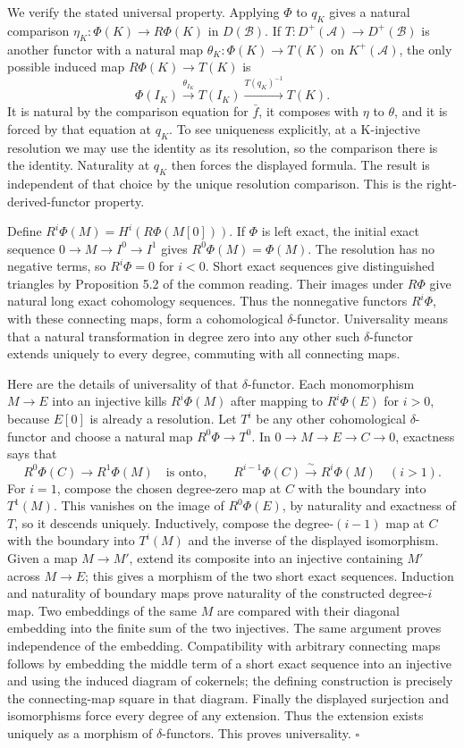 \documentclass[
  english,
  11pt,
  a4paper,
]{article}
\begin{document}
We verify the stated universal property. Applying \(\Phi\) to \(q_K\)
gives a natural comparison \(\eta_K:\Phi(K)\to R\Phi(K)\) in
\(D(\mathcal B)\). If \(T:D^+(\mathcal A)\to D^+(\mathcal B)\) is
another functor with a natural map \(\theta_K:\Phi(K)\to T(K)\) on
\(K^+(\mathcal A)\), the only possible induced map \(R\Phi(K)\to T(K)\)
is \[\Phi(I_K)\xrightarrow{\theta_{I_K}}T(I_K)
\xrightarrow{T(q_K)^{-1}}T(K).\] It is natural by the comparison
equation for \(\bar f\), it composes with \(\eta\) to \(\theta\), and it
is forced by that equation at \(q_K\). To see uniqueness explicitly, at
a K-injective resolution we may use the identity as its resolution, so
the comparison there is the identity. Naturality at \(q_K\) then forces
the displayed formula. The result is independent of that choice by the
unique resolution comparison. This is the right-derived-functor
property.

Define \(R^i\Phi(M)=H^i(R\Phi(M[0]))\). If \(\Phi\) is left exact, the
initial exact sequence \(0\to M\to I^0\to I^1\) gives
\(R^0\Phi(M)=\Phi(M)\). The resolution has no negative terms, so
\(R^i\Phi=0\) for \(i<0\). Short exact sequences give distinguished
triangles by Proposition 5.2 of the common reading. Their images under
\(R\Phi\) give natural long exact cohomology sequences. Thus the
nonnegative functors \(R^i\Phi\), with these connecting maps, form a
cohomological \(\delta\)-functor. Universality means that a natural
transformation in degree zero into any other such \(\delta\)-functor
extends uniquely to every degree, commuting with all connecting maps.

Here are the details of universality of that \(\delta\)-functor. Each
monomorphism \(M\to E\) into an injective kills \(R^i\Phi(M)\) after
mapping to \(R^i\Phi(E)\) for \(i>0\), because \(E[0]\) is already a
resolution. Let \(T^i\) be any other cohomological \(\delta\)-functor
and choose a natural map \(R^0\Phi\to T^0\). In
\(0\to M\to E\to C\to0\), exactness says that
\[R^0\Phi(C)\longrightarrow R^1\Phi(M)
\quad\text{is onto},\qquad
R^{i-1}\Phi(C)\xrightarrow{\ \sim\ }R^i\Phi(M)\quad(i>1).\] For \(i=1\),
compose the chosen degree-zero map at \(C\) with the boundary into
\(T^1(M)\). This vanishes on the image of \(R^0\Phi(E)\), by naturality
and exactness of \(T\), so it descends uniquely. Inductively, compose
the degree-\((i-1)\) map at \(C\) with the boundary into \(T^i(M)\) and
the inverse of the displayed isomorphism. Given a map \(M\to M'\),
extend its composite into an injective containing \(M'\) across
\(M\to E\); this gives a morphism of the two short exact sequences.
Induction and naturality of boundary maps prove naturality of the
constructed degree-\(i\) map. Two embeddings of the same \(M\) are
compared with their diagonal embedding into the finite sum of the two
injectives. The same argument proves independence of the embedding.
Compatibility with arbitrary connecting maps follows by embedding the
middle term of a short exact sequence into an injective and using the
induced diagram of cokernels; the defining construction is precisely the
connecting-map square in that diagram. Finally the displayed surjection
and isomorphisms force every degree of any extension. Thus the extension
exists uniquely as a morphism of \(\delta\)-functors. This proves
universality. \(\square\)
\end{document}
